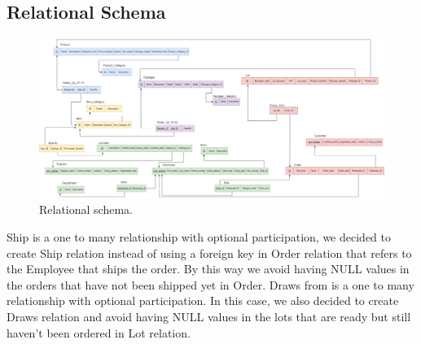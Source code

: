 \subsection{Relational Schema}
\begin{figure}[!h]
	\centering
	\includegraphics[width=1.3\linewidth,angle=270,origin=c]{Relational.png}
	\caption{Relational schema.}
	\label{fig:relational-schema}
\end{figure}
Ship is a one to many relationship with optional participation, we decided to create Ship relation instead of using a foreign key in Order relation that refers to the Employee that ships the order. By this way we avoid having NULL values in the orders that have not been shipped yet in Order.
Draws from is a one to many relationship with optional participation. In this case, we also decided to create Draws relation and avoid having NULL  values in the lots that are ready but still haven't been ordered in Lot relation.
